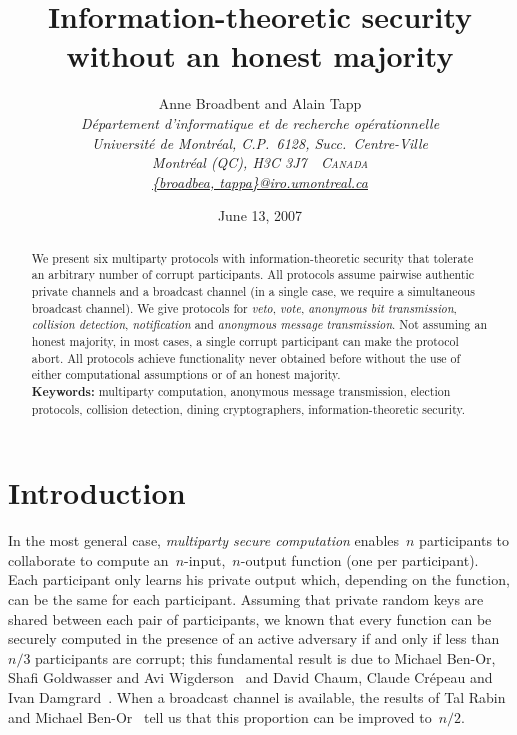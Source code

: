 \documentclass[11pt]{article}
\begin{document}
\title{Information-theoretic security \\ without an honest
majority\\} \vspace{15pt}
\author{Anne Broadbent  and   Alain Tapp\\[.2cm]
\normalsize\sl D\'epartement d'informatique et de recherche op\'erationnelle\\[-0.1cm]
\normalsize\sl Universit\'e de Montr\'eal, C.P.~6128, Succ.\ Centre-Ville\\[-0.1cm]
\normalsize\sl Montr\'eal (QC), H3C 3J7~~\textsc{Canada}\\[.2cm]
\url{{broadbea, tappa}@iro.umontreal.ca} }

\date{June 13, 2007}


\maketitle

\begin{abstract}We present six multiparty protocols with
information-theoretic security that tolerate an arbitrary number of
corrupt participants. All protocols assume pairwise authentic
private channels and a broadcast channel (in a single case, we
require a simultaneous broadcast channel). We give protocols for
\emph{veto},  \emph{vote}, \emph{anonymous bit transmission},
\emph{collision detection}, \emph{notification} and \emph{anonymous
message transmission}. Not assuming an honest majority, in most
cases, a single corrupt participant can make the protocol abort. All
protocols achieve functionality never obtained before without the
use of either computational assumptions or of an honest majority.
\\
\textbf{Keywords:} multiparty computation, anonymous message
transmission, election protocols, collision detection, dining
cryptographers, information-theoretic security.\end{abstract}





\section{Introduction}

In the most general case, \emph{multiparty secure computation}
enables~$n$ participants to collaborate to compute
an~$n$-input,~$n$-output function (one per participant). Each
participant only learns his private output which, depending on the
function, can be the same for each participant. Assuming that
private random keys are shared between each pair of participants, we
known that every  function can be securely computed in the presence
of an active adversary if and only if less than~$n/3$ participants
are corrupt; this fundamental result is due to Michael Ben-Or, Shafi
Goldwasser and Avi Wigderson~\cite{BGW88} and David Chaum, Claude
Cr\'epeau and Ivan Damg\a rard~\cite{CCD88}. When a  broadcast
channel is available, the results of Tal Rabin and Michael
\mbox{Ben-Or}~\cite{RB89} tell us that this proportion can be
improved to~$n/2$.
\end{document}
